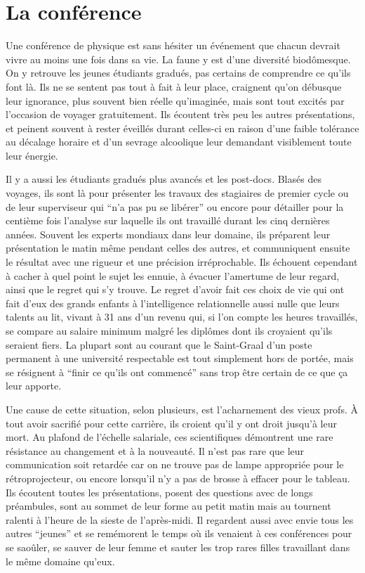 \chapter{La conférence}
Une conférence de physique est sans hésiter un événement que chacun
devrait vivre au moins une fois dans sa vie. La faune y est d'une
diversité biodômesque. On y retrouve les jeunes étudiants gradués, pas
certains de comprendre ce qu'ils font là. Ils ne se sentent pas tout à
fait à leur place, craignent qu'on débusque leur ignorance, plus
souvent bien réelle qu'imaginée, mais sont tout excités par l'occasion
de voyager gratuitement. Ils écoutent très peu les autres
présentations, et peinent souvent à rester éveillés durant celles-ci
en raison d'une faible tolérance au décalage horaire et d'un sevrage
alcoolique leur demandant visiblement toute leur énergie.

Il y a aussi les étudiants gradués plus avancés et les
post-docs. Blasés des voyages, ils sont là pour présenter les travaux
des stagiaires de premier cycle ou de leur superviseur qui “n'a pas pu
se libérer” ou encore pour détailler pour la centième fois l'analyse
sur laquelle ils ont travaillé durant les cinq dernières
années. Souvent les experts mondiaux dans leur domaine, ils préparent
leur présentation le matin même pendant celles des autres, et
communiquent ensuite le résultat avec une rigueur et une précision
irréprochable. Ils échouent cependant à cacher à quel point le sujet
les ennuie, à évacuer l'amertume de leur regard, ainsi que le regret
qui s'y trouve. Le regret d'avoir fait ces choix de vie qui ont fait
d'eux des grands enfants à l'intelligence relationnelle aussi nulle
que leurs talents au lit, vivant à 31 ans d'un revenu qui, si l'on
compte les heures travaillés, se compare au salaire minimum malgré les
diplômes dont ils croyaient qu'ils seraient fiers. La plupart sont au
courant que le Saint-Graal d'un poste permanent à une université
respectable est tout simplement hors de portée, mais se résignent à
“finir ce qu'ils ont commencé” sans trop être certain de ce que ça
leur apporte.

Une cause de cette situation, selon plusieurs, est l'acharnement des
vieux profs. À tout avoir sacrifié pour cette carrière, ils croient
qu'il y ont droit jusqu'à leur mort. Au plafond de l'échelle
salariale, ces scientifiques démontrent une rare résistance au
changement et à la nouveauté. Il n'est pas rare que leur communication
soit retardée car on ne trouve pas de lampe appropriée pour le
rétroprojecteur, ou encore lorsqu'il n'y a pas de brosse à effacer
pour le tableau. Ils écoutent toutes les présentations, posent des
questions avec de longs préambules, sont au sommet de leur forme au
petit matin mais au tournent ralenti à l'heure de la sieste de
l'après-midi. Il regardent aussi avec envie tous les autres “jeunes”
et se remémorent le temps où ils venaient à ces conférences pour se
saoûler, se sauver de leur femme et sauter les trop rares filles
travaillant dans le même domaine qu'eux.

